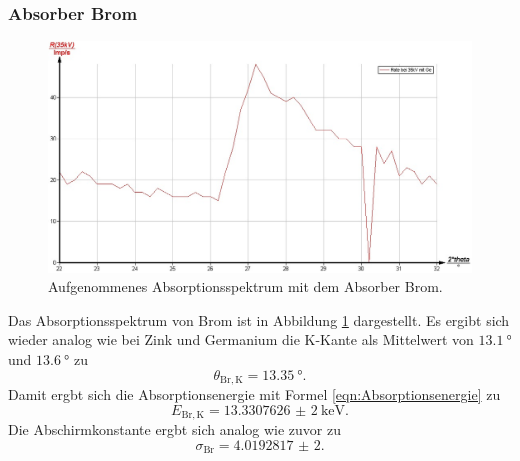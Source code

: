\subsubsection{Absorber Brom}
\begin{figure}
	\includegraphics[width=1.0\textwidth]{nIKO_und_jULIAN_ÜLADS/brom.jpg}
	\caption{Aufgenommenes Absorptionsspektrum mit dem Absorber Brom.}
	\label{fig:brom_absorber}
\end{figure}
Das Absorptionsspektrum von Brom ist in Abbildung \ref{fig:brom_absorber} dargestellt.
Es ergibt sich wieder analog wie bei Zink und Germanium die K-Kante als Mittelwert von 
$\SI{13,1}{\degree}$ und $\SI{13,6}{\degree}$ zu
\begin{equation*}
	\theta_{\mathrm{Br,K}} = \SI{13,35}{\degree} \mathrm{.}
\end{equation*}
Damit ergbt sich die Absorptionsenergie mit Formel \eqref{eqn:Absorptionsenergie} zu
\begin{equation*}
	E_{\mathrm{Br,K}} = \SI{13,3307626(2)}{\kilo\electronvolt} \mathrm{.}
\end{equation*}
Die Abschirmkonstante ergbt sich analog wie zuvor zu
\begin{equation*}
	\sigma_{\mathrm{Br}} = \num{4,0192817(2)} \mathrm{.}
\end{equation*}

\FloatBarrier
